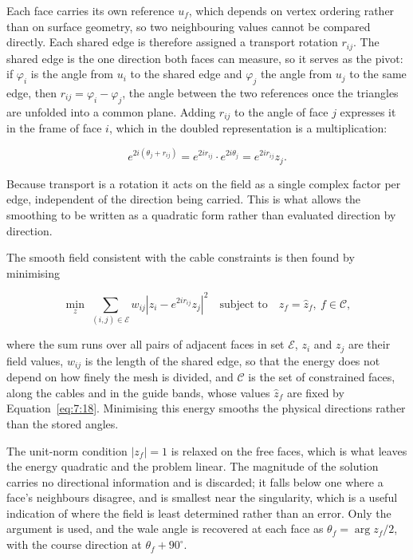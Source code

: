 Each face carries its own reference \(u_{f}\), which depends on vertex ordering rather than on surface geometry, so two neighbouring values cannot be compared directly. Each shared edge is therefore assigned a transport rotation \(r_{ij}\). The shared edge is the one direction both faces can measure, so it serves as the pivot: if \(\varphi_{i}\) is the angle from \(u_{i}\) to the shared edge and \(\varphi_{j}\) the angle from \(u_{j}\) to the same edge, then \(r_{ij} = \varphi_{i} - \varphi_{j}\), the angle between the two references once the triangles are unfolded into a common plane. Adding \(r_{ij}\) to the angle of face \(j\) expresses it in the frame of face \(i\), which in the doubled representation is a multiplication:

\begin{equation}\label{eq:7:19}
  e^{2i\left( \theta_{j} + r_{ij} \right)} = e^{2ir_{ij}} \cdot e^{2i\theta_{j}} = e^{2ir_{ij}}z_{j}.
\end{equation}

Because transport is a rotation it acts on the field as a single complex factor per edge, independent of the direction being carried. This is what allows the smoothing to be written as a quadratic form rather than evaluated direction by direction.

The smooth field consistent with the cable constraints is then found by minimising

\begin{equation}\label{eq:7:20}
  \min_{z} \ \sum_{(i,j) \in \mathcal{E}} w_{ij}\left\lvert z_{i} - e^{2ir_{ij}}z_{j} \right\rvert^{2}
  \quad \text{subject to} \quad z_{f} = \hat{z}_{f}, \ f \in \mathcal{C},
\end{equation}

where the sum runs over all pairs of adjacent faces in set \(\mathcal{E}\), \(z_{i}\) and \(z_{j}\) are their field values, \(w_{ij}\) is the length of the shared edge, so that the energy does not depend on how finely the mesh is divided, and \(\mathcal{C}\) is the set of constrained faces, along the cables and in the guide bands, whose values \(\hat{z}_{f}\) are fixed by Equation~\eqref{eq:7:18}. Minimising this energy smooths the physical directions rather than the stored angles.

The unit-norm condition \(\lvert z_{f} \rvert = 1\) is relaxed on the free faces, which is what leaves the energy quadratic and the problem linear. The magnitude of the solution carries no directional information and is discarded; it falls below one where a face's neighbours disagree, and is smallest near the singularity, which is a useful indication of where the field is least determined rather than an error. Only the argument is used, and the wale angle is recovered at each face as \(\theta_{f} = \arg z_{f}/2\), with the course direction at \(\theta_{f} + 90^{\circ}\).

